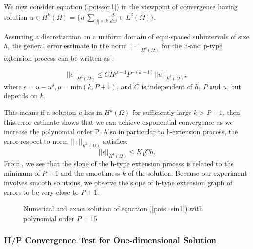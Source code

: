 
We now consider equation (\ref{poisson1}) in the viewpoint of
convergence having solution $u \in H^k(\Omega)= \{u|\sum_{|j|\le k
}\frac{d^j}{dx^j} \in L^2(\Omega) \}$.

Assuming a discretization on a uniform domain of equi-spaced
subintervals of size $h$, the general error estimate in the norm
$||\cdot||_{H^k(\Omega)}$ for the h-and p-type extension process
can be written as \cite{Karniadarkis}:

\begin{equation}
\label{hprelation}
||\epsilon||_{H^k(\Omega)} \le CH^{\mu-1}P^{-(k-1)}||u||_{H^k(\Omega)},
\end{equation}
where $\epsilon = u - u^{\delta}, \mu = \mbox{min}(k, P+1)$, and $C$ is independent of $h$, $P$ and $u$, but depends on $k$.

This means if a solution $u$ lies in  $H^k(\Omega)$ for sufficiently large $k > P+1$, then this error estimate shows that we can achieve exponential convergence as we increase the polynomial order P. Also in particular to h-extension process, the error respect to norm $||\cdot||_{H^1(\Omega)}$ satisfies:
\begin{equation}
\label{hrelation} ||\epsilon||_{H^1(\Omega)} \le K_1Ch.
\end{equation}
From \cite{Karniadarkis}, we see that the slope of the h-type
extension process is related to the minimum of $P+1$ and the
smoothness $k$ of the solution. Because our experiment involves
smooth solutions, we observe the slope of h-type extension graph
of errors to be very close to $P+1$.

\begin{figure}[h]
    \begin{center}
    \caption{\label{sinsol1}Numerical and exact solution of equation (\ref{pois_sin1}) with polynomial order $P=15$}
    \end{center}
\end{figure}

\subsubsection {H/P Convergence Test for One-dimensional Solution}

